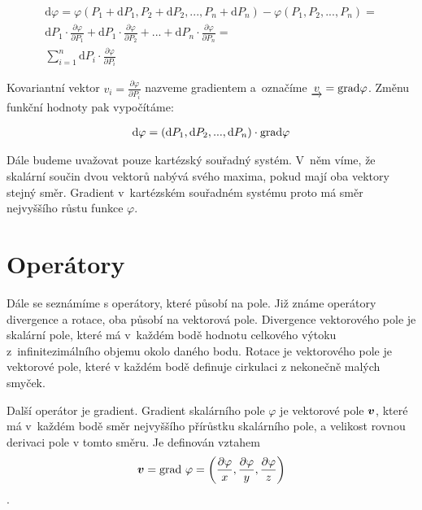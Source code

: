 \begin{equation}
\begin{split}
\mathrm{d} \varphi = \varphi(P_1 + \mathrm{d}P_1, P_2 + \mathrm{d}P_2, ..., P_n + \mathrm{d}P_n) - \varphi(P_1, P_2, ..., P_n) = \\
\mathrm{d}P_1 \cdot \frac{\partial \varphi}{\partial P_1} + \mathrm{d}P_1 \cdot \frac{\partial \varphi}{\partial P_2} +
... + \mathrm{d}P_n \cdot \frac{\partial \varphi}{\partial P_n} = \\
\sum_{i=1}^n \mathrm{d}P_i \cdot \frac{\partial \varphi}{\partial P_i}
\end{split}
\end{equation}

Kovariantní vektor \(v_i = \frac{\partial \varphi}{\partial P_i}\) nazveme gradientem a~označíme \(\underrightarrow{v} = \mathrm{grad}{\varphi}\). Změnu funkční hodnoty pak vypočítáme:

\begin{equation}
\begin{split}
\mathrm{d}\varphi = (\mathrm{d}P_1, \mathrm{d}P_2, ..., \mathrm{d}P_n) \cdot \mathrm{grad}{\varphi} 
\end{split}
\end{equation}

Dále budeme uvažovat pouze kartézský souřadný systém. V~něm víme, že skalární součin dvou vektorů nabývá svého maxima, pokud
mají oba vektory stejný směr. Gradient v~kartézském souřadném systému proto má směr nejvyššího růstu funkce \(\varphi\).



\section{Operátory}

Dále se seznámíme s operátory, které působí na pole. Již známe operátory divergence a rotace, oba působí na vektorová pole. Divergence vektorového pole
je skalární pole, které má v~každém bodě hodnotu celkového výtoku z~infinitezimálního objemu okolo daného bodu. Rotace je vektorového pole je vektorové
pole, které v každém bodě definuje cirkulaci z nekonečně malých smyček.

Další operátor je gradient. Gradient skalárního pole \(\varphi\) je vektorové pole \(\boldsymbol{v}\), které má v~každém bodě směr nejvyššího přírůstku skalárního pole, a velikost rovnou derivaci pole v tomto směru. Je definován vztahem
\[
\boldsymbol{v} = \mathrm{grad} \ \varphi = \left(\frac{\partial \varphi}{x}, \frac{\partial \varphi}{y}, \frac{\partial \varphi}{z}\right)
\].

